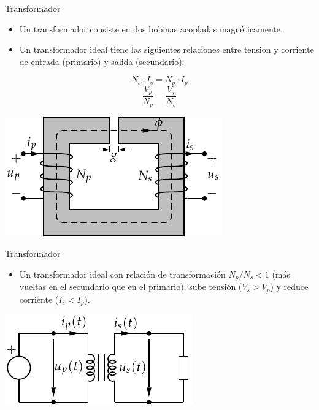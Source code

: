 \documentclass[xcolor={usenames,svgnames,dvipsnames}]{beamer}
\begin{document}
\begin{frame}[label={sec:org623a1ed}]{Transformador}
\begin{itemize}
\item Un transformador consiste en dos bobinas acopladas magnéticamente.

\item Un transformador ideal tiene las siguientes relaciones entre tensión
y corriente de entrada (primario) y salida (secundario):
\end{itemize}

$$N_{s}\cdot I_{s}=N_{p}\cdot I_{p}$$
$$\frac{V_{p}}{N_{p}}=\frac{V_{s}}{N_{s}}$$

\begin{center}
\includegraphics[height=0.3\textheight]{../figs/Transformador2.pdf}
\end{center}
\end{frame}

\begin{frame}[label={sec:orgf0a88a3}]{Transformador}
\begin{itemize}
\item Un transformador ideal con relación de transformación \(N_{p}/N_{s}<1\)
(más vueltas en el secundario que en el primario), sube tensión
(\(V_{s}>V_{p}\)) y reduce corriente (\(I_{s}<I_{p}\)).
\end{itemize}

\begin{center}
\includegraphics[width=.9\linewidth]{../figs/Transformador.pdf}
\end{center}
\end{frame}
\end{document}
